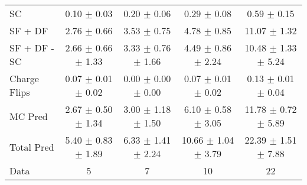 \begin{tabular}{l|cccc}
                                 SC &  0.10 $\pm$  0.03 &  0.20 $\pm$  0.06 &  0.29 $\pm$  0.08 &  0.59 $\pm$  0.15 \\
                            SF + DF &  2.76 $\pm$  0.66 &  3.53 $\pm$  0.75 &  4.78 $\pm$  0.85 & 11.07 $\pm$  1.32 \\
\hline
                       SF + DF - SC &  2.66 $\pm$  0.66 $\pm$  1.33 &  3.33 $\pm$  0.76 $\pm$  1.66 &  4.49 $\pm$  0.86 $\pm$  2.24 & 10.48 $\pm$  1.33 $\pm$  5.24 \\
\hline\hline
                       Charge Flips &  0.07 $\pm$  0.01 $\pm$  0.02 &  0.00 $\pm$  0.00 $\pm$  0.00 &  0.07 $\pm$  0.01 $\pm$  0.02 &  0.13 $\pm$  0.01 $\pm$  0.04 \\
\hline
                            MC Pred &  2.67 $\pm$  0.50 $\pm$  1.34 &  3.00 $\pm$  1.18 $\pm$  1.50 &  6.10 $\pm$  0.58 $\pm$  3.05 & 11.78 $\pm$  0.72 $\pm$  5.89 \\
\hline
                         Total Pred &  5.40 $\pm$  0.83 $\pm$  1.89 &  6.33 $\pm$  1.41 $\pm$  2.24 & 10.66 $\pm$  1.04 $\pm$  3.79 & 22.39 $\pm$  1.51 $\pm$  7.88 \\
\hline\hline
                               Data &     5 &     7 &    10 &    22 \\
\hline\hline
\end{tabular}

